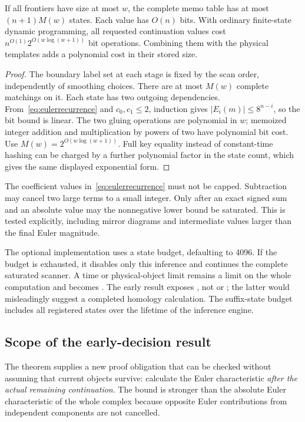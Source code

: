 \begin{proposition}\label{prop:eulercost}
If all frontiers have size at most $w$, the complete memo table has at most
$(n+1)M(w)$ states. Each value has $O(n)$ bits. With ordinary finite-state
dynamic programming, all requested continuation values cost
$n^{O(1)}2^{O(w\log(w+1))}$ bit operations. Combining them with the physical
templates adds a polynomial cost in their stored size.
\end{proposition}
\begin{proof}
The boundary label set at each stage is fixed by the scan order, independently
of smoothing choices. There are at most $M(w)$ complete matchings on it.
Each state has two outgoing dependencies. From~\eqref{eq:eulerrecurrence}
and $c_0,c_1\le2$, induction gives $|E_i(m)|\le8^{n-i}$, so the bit bound
is linear. The two gluing operations are polynomial in $w$; memoized integer
addition and multiplication by powers of two have polynomial bit cost.
Use $M(w)=2^{O(w\log(w+1))}$. Full key equality instead of constant-time
hashing can be charged by a further polynomial factor in the state count,
which gives the same displayed exponential form.
\end{proof}

The coefficient values in~\eqref{eq:eulerrecurrence} must not be capped.
Subtraction may cancel two large terms to a small integer. Only after an
exact signed sum and an absolute value may the nonnegative lower bound be
saturated. This is tested explicitly, including mirror diagrams and
intermediate values larger than the final Euler magnitude.

The optional implementation uses a state budget, defaulting to 4096. If the
budget is exhausted, it disables only this inference and continues the
complete saturated scanner. A time or physical-object limit remains a limit
on the whole computation and becomes \UNKNOWN. The early result exposes
, not  or
; the latter would misleadingly suggest a completed
homology calculation. The suffix-state budget includes all registered
states over the lifetime of the inference engine.

\subsection{Scope of the early-decision result}
The theorem supplies a new proof obligation that can be checked without
assuming that current objects survive: calculate the Euler characteristic
\emph{after the actual remaining continuation}. The bound is stronger than
the absolute Euler characteristic of the whole complex because opposite
Euler contributions from independent components are not cancelled.

